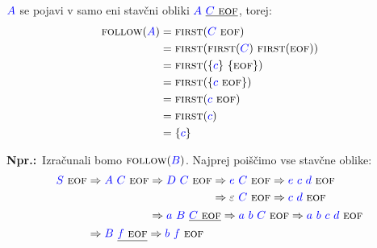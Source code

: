 \documentclass{article}
\newcommand{\Ex}{\textbf{Npr.:}\ }
\newcommand{\FIRST}{\textsc{first}}
\newcommand{\FOLLOW}{\textsc{follow}}
\newcommand{\EOF}{\textsc{eof}}
\newcommand{\Symbol}[1]{\textcolor{blue}{#1}}
\newcommand{\Null}{\varepsilon}
\newcommand{\Derive}{\Rightarrow}
\newcommand{\Seq}{\ }
\begin{document}
$\Symbol{A}$ se pojavi v samo eni stavčni obliki $\Symbol{A} \Seq \underline{\Symbol{C} \Seq \EOF}$, torej:
\begin{align*}
  \FOLLOW(\Symbol{A}) &= \FIRST(\Symbol{C} \Seq \EOF) \\
             &= \FIRST(\FIRST(\Symbol{C}) \Seq \FIRST(\EOF))\\
             &= \FIRST(\{\Symbol{c}\} \Seq \{\EOF\})\\
             &= \FIRST(\{\Symbol{c} \Seq \EOF\})\\
             &= \FIRST(\Symbol{c} \Seq \EOF) \\
             &= \FIRST(\Symbol{c})\\
             &= \{\Symbol{c}\}
\end{align*}

\Ex Izračunali bomo $\FOLLOW(\Symbol{B})$.
Najprej poiščimo vse stavčne oblike:
\begin{equation*}
  \Symbol{S} \Seq \EOF \begin{aligned}[t]
    &\Derive \Symbol{A} \Seq \Symbol{C} \Seq \EOF \begin{aligned}[t]
      &\Derive \Symbol{D} \Seq \Symbol{C} \Seq \EOF \begin{aligned}[t]
        &\Derive \Symbol{e} \Seq \Symbol{C} \Seq \EOF \Derive \Symbol{e} \Seq \Symbol{c} \Seq \Symbol{d} \Seq \EOF \\
        &\Derive \Null \Seq \Symbol{C} \Seq \EOF \Derive \Symbol{c} \Seq \Symbol{d} \Seq \EOF \\
      \end{aligned}\\
      &\Derive \Symbol{a} \Seq \Symbol{B} \Seq \underline{\Symbol{C} \Seq \EOF} \Derive \Symbol{a} \Seq \Symbol{b} \Seq \Symbol{C} \Seq \EOF \Derive \Symbol{a} \Seq \Symbol{b} \Seq \Symbol{c} \Seq \Symbol{d} \Seq \EOF
    \end{aligned}\\
    &\Derive \Symbol{B} \Seq \underline{\Symbol{f} \Seq \EOF} \Derive \Symbol{b} \Seq \Symbol{f} \Seq \EOF
  \end{aligned}
\end{equation*}
\end{document}
